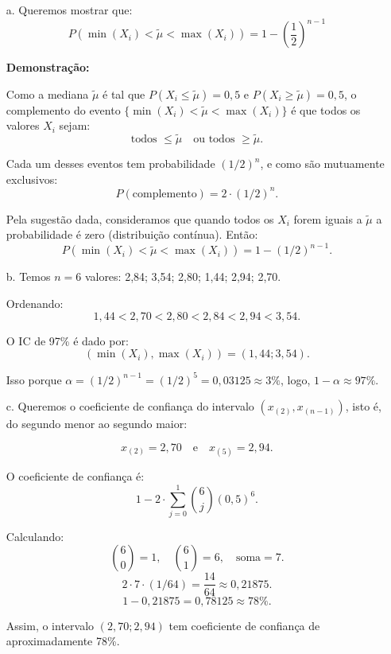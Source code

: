 \documentclass[12pt]{article}
\begin{document}
\begin{enumerate}
    \item[a.] Queremos mostrar que:
    \[
    P(\min(X_i) < \tilde{\mu} < \max(X_i)) = 1 - \left(\frac12\right)^{n-1}
    \]
    
    \textbf{Demonstração:}
    
    Como a mediana \(\tilde{\mu}\) é tal que \(P(X_i \leq \tilde{\mu})=0,5\) e \(P(X_i \geq \tilde{\mu})=0,5\), o complemento do evento \(\{\min(X_i) < \tilde{\mu} < \max(X_i)\}\) é que todos os valores \(X_i\) sejam:
    \[
    \text{todos } \leq \tilde{\mu} \quad \text{ou todos } \geq \tilde{\mu}.
    \]
    
    Cada um desses eventos tem probabilidade \((1/2)^n\), e como são mutuamente exclusivos:
    \[
    P(\text{complemento}) = 2 \cdot (1/2)^n.
    \]
    
    Pela sugestão dada, consideramos que quando todos os \(X_i\) forem iguais a \(\tilde{\mu}\) a probabilidade é zero (distribuição contínua). Então:
    \[
    P(\min(X_i) < \tilde{\mu} < \max(X_i)) = 1 - (1/2)^{n-1}.
    \]
    
    
    \item[b.] Temos \(n=6\) valores: 2,84; 3,54; 2,80; 1,44; 2,94; 2,70.
    
    Ordenando:
    \[
    1,44 < 2,70 < 2,80 < 2,84 < 2,94 < 3,54.
    \]
    
    O IC de 97\% é dado por:
    \[
    (\min(X_i), \max(X_i)) = (1,44; 3,54).
    \]
    
    Isso porque \(\alpha = (1/2)^{n-1} = (1/2)^5 = 0,03125 \approx 3\%\), logo, \(1-\alpha \approx 97\%\).
    
    \item[c.] Queremos o coeficiente de confiança do intervalo \((x_{(2)}, x_{(n-1)})\), isto é, do segundo menor ao segundo maior:
    
    \[
    x_{(2)}=2,70 \quad\text{e}\quad x_{(5)}=2,94.
    \]
    
    O coeficiente de confiança é:
    \[
    1 - 2 \cdot \sum_{j=0}^{1} \binom{6}{j} (0,5)^6.
    \]
    
    Calculando:
    \[
    \binom{6}{0}=1,\quad \binom{6}{1}=6,\quad \text{soma}=7.
    \]
    \[
    2 \cdot 7 \cdot (1/64) = \frac{14}{64} \approx 0,21875.
    \]
    \[
    1 - 0,21875 = 0,78125 \approx 78\%.
    \]
    
    Assim, o intervalo \((2,70; 2,94)\) tem coeficiente de confiança de aproximadamente 78\%.
\end{enumerate}
\end{document}
